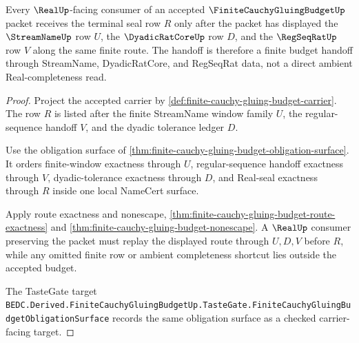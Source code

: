 \begin{theorem}
\label{thm:finite-cauchy-gluing-budget-real-seal-handoff}
Every $\RealUp$-facing consumer of an accepted $\FiniteCauchyGluingBudgetUp$ packet receives the terminal seal row $R$ only after the packet has displayed the $\StreamNameUp$ row $U$, the $\DyadicRatCoreUp$ row $D$, and the $\RegSeqRatUp$ row $V$ along the same finite route. The handoff is therefore a finite budget handoff through StreamName, DyadicRatCore, and RegSeqRat data, not a direct ambient Real-completeness read.
\end{theorem}
\begin{proof}
Project the accepted carrier by \autoref{def:finite-cauchy-gluing-budget-carrier}. The row $R$ is listed after the finite StreamName window family $U$, the regular-sequence handoff $V$, and the dyadic tolerance ledger $D$.

Use the obligation surface of \autoref{thm:finite-cauchy-gluing-budget-obligation-surface}. It orders finite-window exactness through $U$, regular-sequence handoff exactness through $V$, dyadic-tolerance exactness through $D$, and Real-seal exactness through $R$ inside one local NameCert surface.

Apply route exactness and nonescape, \autoref{thm:finite-cauchy-gluing-budget-route-exactness} and \autoref{thm:finite-cauchy-gluing-budget-nonescape}. A $\RealUp$ consumer preserving the packet must replay the displayed route through $U,D,V$ before $R$, while any omitted finite row or ambient completeness shortcut lies outside the accepted budget.

The TasteGate target \texttt{BEDC.Derived.FiniteCauchyGluingBudgetUp.TasteGate.FiniteCauchyGluingBudgetObligationSurface} records the same obligation surface as a checked carrier-facing target.
\end{proof}

